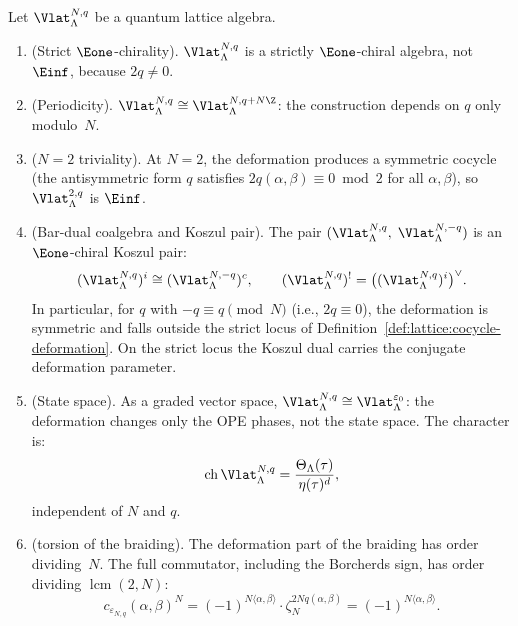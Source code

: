 \begin{theorem}
\label{thm:quantum-lattice-structure}
Let $\Vlat_\Lambda^{N,q}$ be a quantum lattice algebra.
\begin{enumerate}[label=(\roman*)]
\item \textup{(}Strict $\Eone$-chirality\textup{).}
 $\Vlat_\Lambda^{N,q}$ is a strictly $\Eone$-chiral algebra,
 not $\Einf$, because $2q\neq0$.

\item \textup{(}Periodicity\textup{).}
 $\Vlat_\Lambda^{N,q} \cong \Vlat_\Lambda^{N, q + N\Z}$:
 the construction depends on $q$ only modulo~$N$.

\item \textup{(}$N = 2$ triviality\textup{).}
 At $N = 2$, the deformation produces a symmetric cocycle
 \textup{(}the antisymmetric form $q$ satisfies
 $2q(\alpha,\beta) \equiv 0 \bmod 2$ for all
 $\alpha,\beta$\textup{)}, so $\Vlat_\Lambda^{2,q}$ is $\Einf$.

\item \textup{(}Bar-dual coalgebra and Koszul pair\textup{).}
 The pair $(\Vlat_\Lambda^{N,q},\; \Vlat_\Lambda^{N,-q})$ is an
 $\Eone$-chiral Koszul pair:
 \[
 (\Vlat_\Lambda^{N,q})^i \cong (\Vlat_\Lambda^{N,-q})^c,
 \qquad
 (\Vlat_\Lambda^{N,q})^! =
 \bigl((\Vlat_\Lambda^{N,q})^i\bigr)^\vee.
 \]
 In particular, for $q$ with $-q \equiv q \pmod{N}$
 \textup{(}i.e., $2q \equiv 0$\textup{)}, the deformation is
 symmetric and falls outside the strict locus of
 Definition~\textup{\ref{def:lattice:cocycle-deformation}}. On the
 strict locus the Koszul dual carries the conjugate deformation
 parameter.

\item \textup{(}State space\textup{).}
 As a graded vector space,
 $\Vlat_\Lambda^{N,q} \cong \Vlat_\Lambda^{\varepsilon_0}$:
 the deformation changes only the OPE phases, not the state space.
 The character is:
 \[
 \mathrm{ch}\, \Vlat_\Lambda^{N,q}
 = \frac{\Theta_\Lambda(\tau)}{\eta(\tau)^d},
 \]
 independent of $N$ and $q$.

\item \textup{(}torsion of the braiding\textup{).}
 The deformation part of the braiding has order dividing~$N$.
 The full commutator, including the Borcherds sign, has order
 dividing $\operatorname{lcm}(2,N)$:
 \[
 c_{\varepsilon_{N,q}}(\alpha,\beta)^N
 = (-1)^{N\langle\alpha,\beta\rangle} \cdot \zeta_N^{2Nq(\alpha,\beta)}
 = (-1)^{N\langle\alpha,\beta\rangle}.
 \]
\end{enumerate}
\end{theorem}

